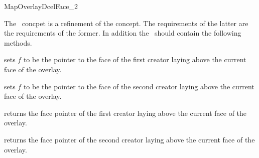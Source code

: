 
\ccRefPageBegin


\begin{ccRefConcept}{MapOverlayDcelFace_2}


The \ccRefName\ concpet is a refinement of the  concept. 
The requirements of the latter are the requirements of the former.
In addition the \ccRefName\ should contain the following methods.

  \ccOperations
  {sets $f$ to be the pointer to the face of the first creator laying above the current face of the overlay.}
  
  {sets $f$ to be the pointer to the face of the second creator laying above the current face of the overlay.}

  {returns the face pointer of the first creator laying above the current face of the overlay.}

  {returns the face pointer of the second creator laying above the current face of the overlay.}
  
\end{ccRefConcept} %

\ccRefPageEnd
